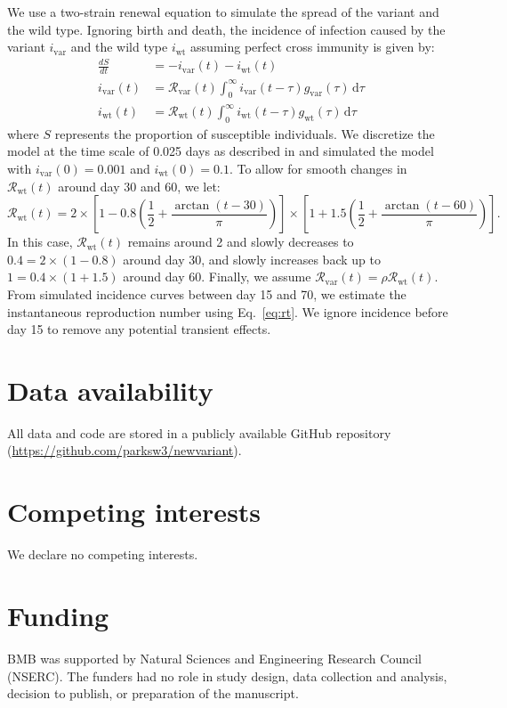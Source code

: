 \documentclass[12pt]{article}
\newcommand{\eref}[1]{Eq.~\ref{eq:#1}}
\newcommand{\vvvar}{\mathrm{var}}
\newcommand{\wwwt}{\mathrm{wt}}
\newcommand{\Rx}[1]{\ensuremath{{\mathcal R}_{#1}}\xspace}
\newcommand{\Rw}{\Rx{\wwwt}}
\newcommand{\Rv}{\Rx{\vvvar}}
\newcommand{\dd}[1]{\ensuremath{\, \mathrm{d}#1}}
\newcommand{\dtau}{\dd{\tau}}
\newcommand{\ix}[1]{\ensuremath{{i}_{#1}}\xspace}
\newcommand{\iw}{\ix{\wwwt}}
\newcommand{\iv}{\ix{\vvvar}}
\begin{document}
We use a two-strain renewal equation to simulate the spread of the variant and the wild type.
Ignoring birth and death, the incidence of infection caused by the variant $\iv$ and the wild type $\iw$ assuming perfect cross immunity is given by:
\begin{align}
\frac{dS}{dt} &= - \iv(t) - \iw(t)\\
\iv(t) &= \Rv(t) \int_{0}^\infty \iv(t-\tau) g_{\mathrm{var}}(\tau) \dtau\\
\iw(t) &= \Rw(t) \int_{0}^\infty \iw(t-\tau) g_{\mathrm{wt}}(\tau) \dtau
\end{align}
where $S$ represents the proportion of susceptible individuals.
We discretize the model at the time scale of 0.025 days as described in \cite{park2021forward} and simulated the model with $\iv(0) = 0.001$ and $\iw(0) = 0.1$.
To allow for smooth changes in $\Rw(t)$ around day 30 and 60, we let:
\begin{equation}
\Rw(t) = 2 \times \left[1 - 0.8 \left(\frac{1}{2} + \frac{\arctan(t-30)}{\pi} \right) \right] \times \left[1 + 1.5 \left(\frac{1}{2} + \frac{\arctan(t-60)}{\pi} \right) \right].
\end{equation}
In this case, $\Rw(t)$ remains around 2 and slowly decreases to $0.4 = 2 \times (1-0.8)$ around day 30, and slowly increases back up to $1 = 0.4 \times (1 + 1.5)$ around day 60.
Finally, we assume $\Rv(t) = \rho \Rw(t)$.
From simulated incidence curves between day 15 and 70, we estimate the instantaneous reproduction number using \eref{rt}.
We ignore incidence before day 15 to remove any potential transient effects.

\section*{Data availability}

All data and code are stored in a publicly available GitHub repository (\url{https://github.com/parksw3/newvariant}).

\section*{Competing interests}

We declare no competing interests.

\section*{Funding}

BMB was supported by Natural Sciences and Engineering Research Council (NSERC). 
The funders had no role in study design, data collection and analysis, decision to publish, or preparation of the manuscript.
\end{document}
